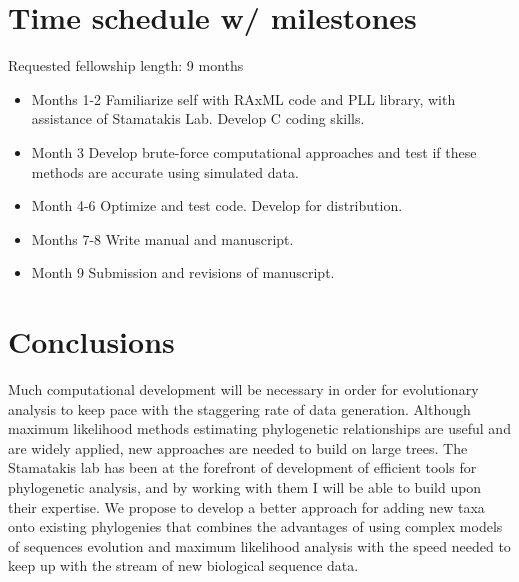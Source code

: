 \documentclass[10pt]{article}
\begin{document}
         
\section*{Time schedule w/ milestones}
   Requested fellowship length: 9 months
 
\begin{itemize}
  \item{Months 1-2} Familiarize self with RAxML code and PLL library, with assistance of Stamatakis Lab. 
Develop C coding skills.
  \item{Month 3} Develop brute-force computational approaches and test if these methods are accurate using simulated data.
  \item{Month 4-6} Optimize and test code. Develop for distribution.
  \item{Months 7-8} Write manual and manuscript.
  \item{Month 9} Submission and revisions of manuscript.
\end{itemize}


\section*{Conclusions}
Much computational development will be necessary in order for evolutionary analysis to keep pace with the staggering rate of data generation. 
Although maximum likelihood methods estimating phylogenetic relationships are useful and are widely applied, new approaches are needed to build on large trees. 
The Stamatakis lab has been at the forefront of development of efficient tools for phylogenetic analysis, and by working with them I will be able to build upon their expertise. 
We propose to develop a better approach for adding new taxa onto existing phylogenies that combines the advantages of using complex models of sequences evolution and maximum likelihood analysis with the speed needed to keep up with the stream of new biological sequence data. 

\pagebreak


\end{document}
